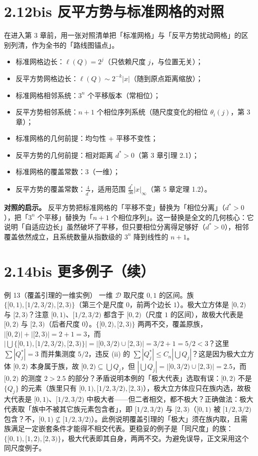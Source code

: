 \documentclass[a4paper,11pt,openany]{ctexbook}
\numberwithin{equation}{chapter}
\numberwithin{figure}{chapter}
\numberwithin{table}{chapter}
\begin{document}
\section{2.12bis 反平方势与标准网格的对照}

在进入第 3 章前，用一张对照清单把「标准网格」与「反平方势扰动网格」的区别列清，作为全书的「路线图锚点」。

\begin{itemize}
\item 标准网格边长：$\ell(Q)=2^j$（只依赖尺度 $j$，与位置无关）；
\item 反平方势网格边长：$\ell(Q)\sim2^{-k}|x|$（随到原点距离缩放）；
\item 标准网格相邻系统：$3^n$ 个平移版本（常相位）；
\item 反平方势相邻系统：$n+1$ 个相位序列系统（随尺度变化的相位 $\theta_i(j)$，第 3 章）；
\item 标准网格的几何前提：均匀性 + 平移不变性；
\item 反平方势的几何前提：相对距离 $d^*>0$（第 3 章引理 2.1）；
\item 标准网格的覆盖常数：$3$（一维）；
\item 反平方势的覆盖常数：$\frac4{d^*}$，适用范围 $\frac{d^*}{36}|x|_\infty$（第 5 章定理 1.2）。
\end{itemize}

\textbf{对照的启示。} 反平方势把标准网格的「平移不变」替换为「相位分离」（$d^*>0$），把「$3^n$ 个平移」替换为「$n+1$ 个相位序列」。这一替换是全文的几何核心：它说明「自适应边长」虽然破坏了平移，但只要相位分离得足够好（$d^*>0$），相邻覆盖依然成立，且系统数量从指数级的 $3^n$ 降到线性的 $n+1$。

\section{2.14bis 更多例子（续）}

\begin{examplebox}{例 13（覆盖引理的一维实例）}
一维 $\mathcal D$ 取尺度 $0,1$ 的区间。族 $\{[0,1),[1/2,3/2),[2,3)\}$（第三个是尺度 $0$，前两个边长 $1$）。极大立方体是 $[0,2)$ 与 $[2,3)$？注意 $[0,1)$、$[1/2,3/2)$ 都含于 $[0,2)$（尺度 $1$ 的区间），故极大代表是 $[0,2)$ 与 $[2,3)$（后者尺度 $0$）。$\{[0,2),[2,3)\}$ 两两不交，覆盖原族，$|[0,2)|+|[2,3)|=2+1=3$，而 $|\bigcup\{[0,1),[1/2,3/2),[2,3)\}|=|[0,3/2)\cup[2,3)|=3/2+1=5/2<3$？这里 $\sum|Q_j^*|=3$ 而并集测度 $5/2$，违反 (ii) 的 $\sum|Q_j^*|\le C_n|\bigcup Q_j|$？这是因为极大立方体 $[0,2)$ 本身属于族，故 $[0,2)\subseteq\bigcup Q_j$，但 $|\bigcup Q_j|=|[0,3/2)\cup[2,3)|=2.5$，而 $[0,2)$ 的测度 $2>2.5$ 的部分？矛盾说明本例的「极大代表」选取有误：$[0,2)$ 不是 $\{Q_j\}$ 的元素（族里只有 $[0,1),[1/2,3/2),[2,3)$），极大立方体应只在族内选，故极大代表是 $[0,1)$、$[1/2,3/2)$ 中极大者——但二者相交，都不极大？正确做法：极大代表取「族中不被其它族元素包含者」，即 $[1/2,3/2)$ 与 $[2,3)$（$[0,1)$ 被 $[1/2,3/2)$ 包含？不，$[0,1)\nsubseteq[1/2,3/2)$）。此例说明覆盖引理的「极大」须在族内取，且需族满足一定嵌套条件才能得不相交代表。更稳妥的例子是「同尺度」的族：$\{[0,1),[1,2),[2,3)\}$，极大代表即其自身，两两不交。为避免误导，正文采用这个同尺度例子。
\end{examplebox}
\end{document}
